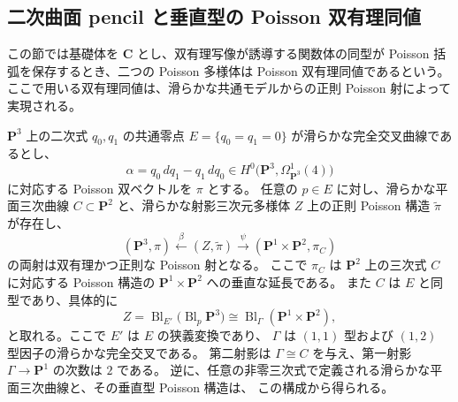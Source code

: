 \subsection{二次曲面 pencil と垂直型の Poisson 双有理同値}
\label{sec:birational-rat22-vertical}

この節では基礎体を $\mathbf C$ とし、双有理写像が誘導する関数体の同型が
Poisson 括弧を保存するとき、二つの Poisson 多様体は Poisson 双有理同値であるという。
ここで用いる双有理同値は、滑らかな共通モデルからの正則 Poisson 射によって実現される。

\begin{theorem}
\label{thm:rat22-vertical}
$\mathbf P^3$ 上の二次式 $q_0,q_1$ の共通零点
$E=\{q_0=q_1=0\}$ が滑らかな完全交叉曲線であるとし、
\[
 \alpha=q_0\,dq_1-q_1\,dq_0
 \in H^0\bigl(\mathbf P^3,\Omega^1_{\mathbf P^3}(4)\bigr)
\]
に対応する Poisson 双ベクトルを $\pi$ とする。
任意の $p\in E$ に対し、滑らかな平面三次曲線
$C\subset\mathbf P^2$ と、滑らかな射影三次元多様体 $Z$ 上の正則 Poisson 構造
$\widetilde\pi$ が存在し、
\[
 (\mathbf P^3,\pi)
 \xleftarrow{\ \beta\ }
 (Z,\widetilde\pi)
 \xrightarrow{\ \psi\ }
 (\mathbf P^1\times\mathbf P^2,\pi_C)
\]
の両射は双有理かつ正則な Poisson 射となる。
ここで $\pi_C$ は $\mathbf P^2$ 上の三次式 $C$ に対応する Poisson 構造の
$\mathbf P^1\times\mathbf P^2$ への垂直な延長である。
また $C$ は $E$ と同型であり、具体的に
\[
 Z=\operatorname{Bl}_{E'}\bigl(\operatorname{Bl}_p\mathbf P^3\bigr)
 \cong\operatorname{Bl}_{\Gamma}(\mathbf P^1\times\mathbf P^2),
\]
と取れる。ここで $E'$ は $E$ の狭義変換であり、
$\Gamma$ は $(1,1)$ 型および $(1,2)$ 型因子の滑らかな完全交叉である。
第二射影は $\Gamma\cong C$ を与え、第一射影 $\Gamma\to\mathbf P^1$ の次数は $2$ である。
逆に、任意の非零三次式で定義される滑らかな平面三次曲線と、その垂直型 Poisson 構造は、
この構成から得られる。
\end{theorem}

